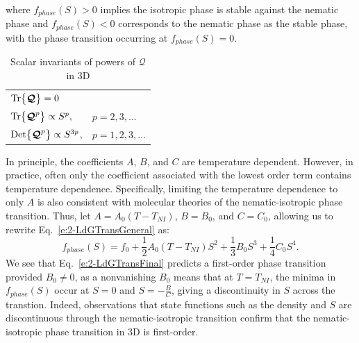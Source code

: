 where $f_{phase}(S) > 0$ implies the isotropic phase is stable against the nematic phase and $f_{phase}(S) < 0$ corresponds to the nematic phase as the stable phase, with the phase transition occurring at $f_{phase}(S) = 0$.
\begin{table}[t]
  \centering
  \caption{Scalar invariants of powers of $\bm{\mathcal{Q}}$ in 3D}
  \label{t:2-powersQ}
  \begin{tabular}{|l l|}
    \hline
    $\textup{Tr} \big \{ \bm{\mathcal{Q}} \big \} = 0$ & \\
    $\textup{Tr} \big \{ \bm{\mathcal{Q}}^p \big \} \propto S^p,$ & $p = 2,3, \dots$ \\
    $\textup{Det} \big \{ \bm{\mathcal{Q}}^p \big \} \propto S^{3p}$, & $p = 1,2,3,\dots$ \\
    \hline
  \end{tabular}
\end{table}
In principle, the coefficients $A$, $B$, and $C$ are temperature dependent.
However, in practice, often only the coefficient associated with the lowest order term contains temperature dependence.
Specifically, limiting the temperature dependence to only $A$ is also consistent with molecular theories of the nematic-isotropic phase transition.
Thus, let $A = A_0(T-T_{NI})$, $B = B_0$, and $C = C_0$, allowing us to rewrite Eq.~\ref{e:2-LdGTransGeneral} as:
\begin{equation}
  f_{phase}(S) = f_0 + \frac{1}{2}A_0(T-T_{NI}) S^2 + \frac{1}{3}B_0 S^3 + \frac{1}{4}C_0 S^4.\label{e:2-LdGTransFinal}
\end{equation}
We see that Eq.~\ref{e:2-LdGTransFinal} predicts a first-order phase transition provided $B_0 \neq  0$, as a nonvanishing $B_0$ means that at $T = T_{NI}$, the minima in $f_{phase}(S)$ occur at $S = 0$ and $S = -\frac{B}{C}$, giving a discontinuity in $S$ across the transtion.
Indeed, observations that state functions such as the density and $S$ are discontinuous through the nematic-isotropic transition confirm that the nematic-isotropic phase transition in 3D is first-order. \\

